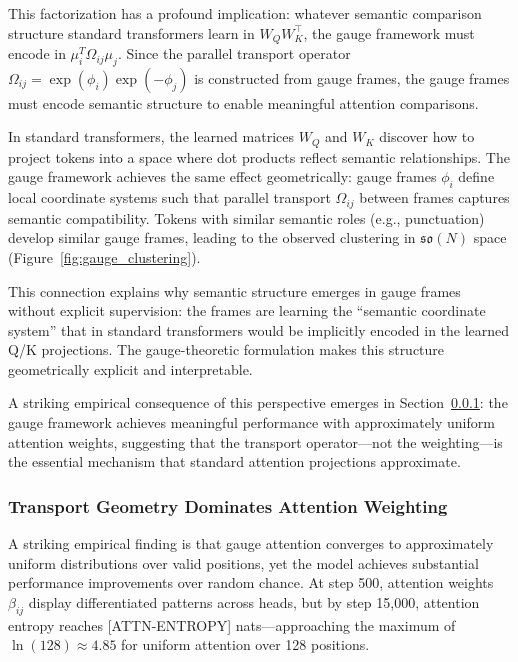 \documentclass[twoside,11pt]{article}
\begin{document}
This factorization has a profound implication: whatever semantic comparison structure standard transformers learn in $W_Q W_K^\top$, the gauge framework must encode in $\mu_i^T \Omega_{ij}\mu_j$. Since the parallel transport operator $\Omega_{ij} = \exp(\phi_i)\exp(-\phi_j)$ is constructed from gauge frames, the gauge frames must encode semantic structure to enable meaningful attention comparisons.

In standard transformers, the learned matrices $W_Q$ and $W_K$ discover how to project tokens into a space where dot products reflect semantic relationships. The gauge framework achieves the same effect geometrically: gauge frames $\phi_i$ define local coordinate systems such that parallel transport $\Omega_{ij}$ between frames captures semantic compatibility. Tokens with similar semantic roles (e.g., punctuation) develop similar gauge frames, leading to the observed clustering in $\mathfrak{so}(N)$ space (Figure~\ref{fig:gauge_clustering}).

This connection explains why semantic structure emerges in gauge frames without explicit supervision: the frames are learning the ``semantic coordinate system'' that in standard transformers would be implicitly encoded in the learned Q/K projections. The gauge-theoretic formulation makes this structure geometrically explicit and interpretable.

A striking empirical consequence of this perspective emerges in Section~\ref{sec:attention_dynamics}: the gauge framework achieves meaningful performance with approximately uniform attention weights, suggesting that the transport operator---not the weighting---is the essential mechanism that standard attention projections approximate.

\subsubsection{Transport Geometry Dominates Attention Weighting}
\label{sec:attention_dynamics}

A striking empirical finding is that gauge attention converges to approximately uniform distributions over valid positions, yet the model achieves substantial performance improvements over random chance. At step 500, attention weights $\beta_{ij}$ display differentiated patterns across heads, but by step 15,000, attention entropy reaches [ATTN-ENTROPY] nats---approaching the maximum of $\ln(128) \approx 4.85$ for uniform attention over 128 positions.
\end{document}

